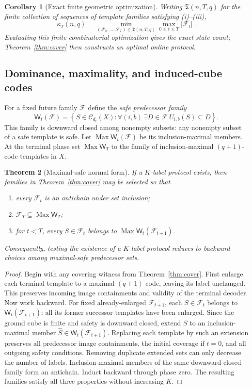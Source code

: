 \documentclass[11pt,a4paper]{article}
\newtheorem{theorem}{Theorem}[section]
\newtheorem{corollary}[theorem]{Corollary}
\begin{document}
\begin{corollary}[Exact finite geometric optimization]\label{cor:kappa}
Writing $\mathfrak T(n,T,q)$ for the finite collection of sequences of template families satisfying (i)--(iii),
\[
\boxed{\ \kappa_T(n,q)=\min_{(\mathcal F_0,\ldots,\mathcal F_T)\in\mathfrak T(n,T,q)}\max_{0\le t\le T}|\mathcal F_t|\ .\ }
\]
Evaluating this finite combinatorial optimization gives the exact state count; Theorem~\ref{thm:cover} then constructs an optimal online protocol.
\end{corollary}

\subsection{Dominance, maximality, and induced-cube codes}
For a fixed future family $\mathcal F$ define the \emph{safe predecessor family}
\[
\mathsf W_t(\mathcal F)=\left\{S\in\mathcal C_{d_t}(X):
\forall(i,b)\ \exists D\in\mathcal F\ U_{i,b}(S)\subseteq D\right\}.
\]
This family is downward closed among nonempty subsets: any nonempty subset of a safe template is safe. Let $\operatorname{Max}\mathsf W_t(\mathcal F)$ be its inclusion-maximal members. At the terminal phase set $\operatorname{Max}\mathsf W_T$ to the family of inclusion-maximal $(q+1)$-code templates in $X$.

\begin{theorem}[Maximal-safe normal form]\label{thm:max}
If a $K$-label protocol exists, then families in Theorem~\ref{thm:cover} may be selected so that
\begin{enumerate}[label=(\alph*),leftmargin=2em]
\item every $\mathcal F_t$ is an antichain under set inclusion;
\item $\mathcal F_T\subseteq\operatorname{Max}\mathsf W_T$;
\item for $t<T$, every $S\in\mathcal F_t$ belongs to $\operatorname{Max}\mathsf W_t(\mathcal F_{t+1})$.
\end{enumerate}
Consequently, testing the existence of a $K$-label protocol reduces to backward choices among maximal-safe predecessor sets.
\end{theorem}
\begin{proof}
Begin with any covering witness from Theorem~\ref{thm:cover}. First enlarge each terminal template to a maximal $(q+1)$-code, leaving its label unchanged. This preserves incoming image containments and validity of the terminal decoder. Now work backward. For fixed already-enlarged $\mathcal F_{t+1}$, each $S\in\mathcal F_t$ belongs to $\mathsf W_t(\mathcal F_{t+1})$: all its former successor templates have been enlarged. Since the ground cube is finite and safety is downward closed, extend $S$ to an inclusion-maximal member $\widehat S\in\mathsf W_t(\mathcal F_{t+1})$. Replacing each template by such an extension preserves all predecessor image containments, the initial coverage if $t=0$, and all outgoing safety conditions. Removing duplicate extended sets can only decrease the number of labels. Inclusion-maximal members of the same downward-closed family form an antichain. Induct backward through phase zero. The resulting families satisfy all three properties without increasing $K$.
\end{proof}
\end{document}
